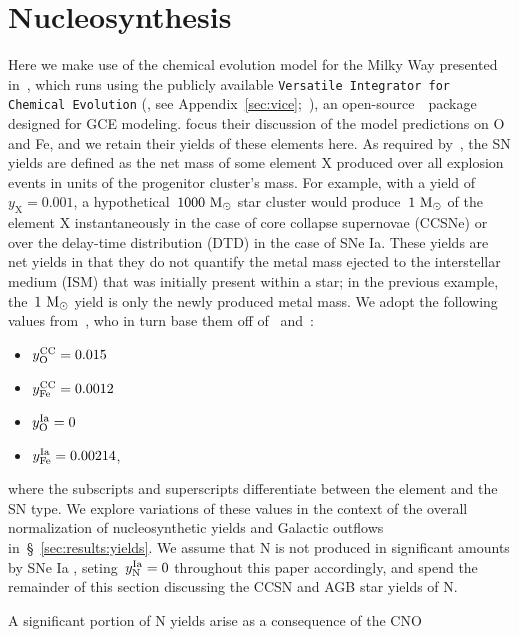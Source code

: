 \documentclass[ms.tex]{subfiles}
\begin{document}
\section{Nucleosynthesis}
\label{sec:yields}

Here we make use of the chemical evolution model for the Milky Way
presented in~\citet{Johnson2021}, which runs using the publicly available
\texttt{Versatile Integrator for Chemical Evolution}
(\vice, see Appendix~\ref{sec:vice};~\citealp{Johnson2020, Griffith2021a,
Johnson2021}), an open-source~\python~package designed for GCE modeling.
\citet{Johnson2021} focus their discussion of the model predictions on O and
Fe, and we retain their yields of these elements here.
As required by~\vice, the SN yields are defined as the net mass of some element
X produced over all explosion events in units of the progenitor cluster's
mass.
For example, with a yield of~$y_\text{X} = 0.001$, a hypothetical~$1000~\text{M}_\odot$
star cluster would produce~$1~\text{M}_\odot$ of the element X instantaneously in the
case of core collapse supernovae (CCSNe) or over the delay-time distribution
(DTD) in the case of SNe Ia.
These yields are net yields in that they do not quantify the metal mass
ejected to the interstellar medium (ISM) that was initially present within a
star; in the previous example, the~$1~\text{M}_\odot$ yield is only the newly produced
metal mass.
We adopt the following values from~\citet{Johnson2021}, who in turn base them
off of~\citet*{Weinberg2017} and~\citet{Johnson2020}:
\begin{itemize}
	\item $y_\text{O}^\text{CC} = 0.015$

	\item $y_\text{Fe}^\text{CC} = 0.0012$

	\item $y_\text{O}^\text{Ia} = 0$

	\item $y_\text{Fe}^\text{Ia} = 0.00214$,
\end{itemize}
where the subscripts and superscripts differentiate between the element and the
SN type.
We explore variations of these values in the context of the overall
normalization of nucleosynthetic yields and Galactic outflows
in~\S~\ref{sec:results:yields}.
We assume that N is not produced in significant amounts by SNe Ia
\citep{Johnson2019}, seting~$y_\text{N}^\text{Ia} = 0$ throughout this paper
accordingly, and spend the remainder of this section discussing the CCSN and
AGB star yields of N.
\par
A significant portion of N yields arise as a consequence of the CNO
\end{document}
